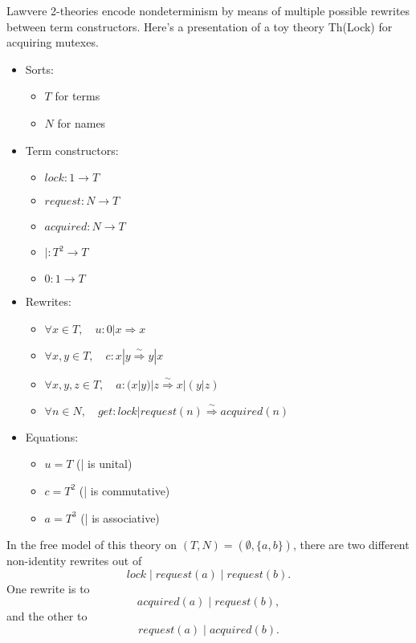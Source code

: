 \documentclass{article}
\newcommand{\maps}{\colon}
\begin{document}
Lawvere 2-theories encode nondeterminism by means of multiple possible rewrites between term constructors.  Here's a presentation of a toy theory Th(Lock) for acquiring mutexes.
\begin{center}
  \begin{itemize}
    \item Sorts:
    \begin{itemize}
      \item $T$ for terms
      \item $N$ for names
    \end{itemize}
    \item Term constructors:
    \begin{itemize}
      \item $lock\maps 1 \to T$
      \item $request\maps N \to T$
      \item $acquired\maps N \to T$
      \item $|\maps T^2 \to T$
      \item $0 \maps 1 \to T$
    \end{itemize}
    \item Rewrites:
    \begin{itemize}
      \item $\forall x \in T, \quad u\maps 0|x \Rightarrow x$
      \item $\forall x,y \in T,\quad c\maps x|y \stackrel{\sim}{\Rightarrow} y|x$
      \item $\forall x,y,z \in T,\quad a\maps (x|y)|z \stackrel{\sim}{\Rightarrow} x|(y|z)$
      \item $\forall n \in N,\quad get\maps lock | request(n) \stackrel{\sim}{\Rightarrow} acquired(n)$
    \end{itemize}
    \item Equations:
    \begin{itemize}
      \item $u = T$ (| is unital)
      \item $c = T^2$ (| is commutative)
      \item $a = T^3$ (| is associative)
    \end{itemize}
  \end{itemize}
\end{center}
In the free model of this theory on $(T, N) = (\emptyset, \{ a,b\})$, there are two different non-identity rewrites out of
\[ lock \;|\; request(a) \;|\; request(b). \]
One rewrite is to
\[ acquired(a) \;|\; request(b), \]
and the other to
\[ request(a) \;|\; acquired(b). \]
\end{document}
